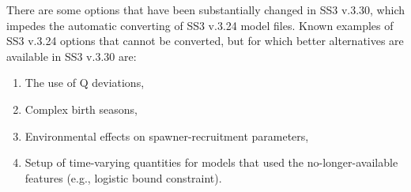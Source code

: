 \noindent There are some options that have been substantially changed in SS3 v.3.30, which impedes the automatic converting of SS3 v.3.24 model files. Known examples of SS3 v.3.24 options that cannot be converted, but for which better alternatives are available in SS3 v.3.30 are:
\begin{enumerate}
	\item The use of Q deviations,
	\item Complex birth seasons,
	\item Environmental effects on spawner-recruitment parameters,
	\item Setup of time-varying quantities for models that used the no-longer-available features (e.g., logistic bound constraint).\end{enumerate}

\pagebreak
